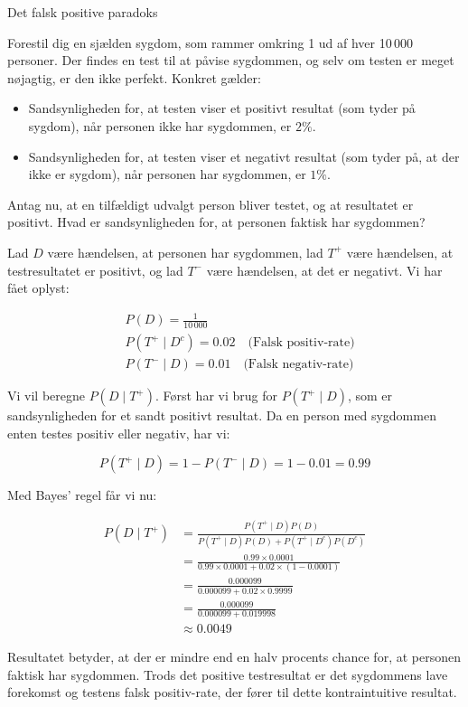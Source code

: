 \begin{example} Det falsk positive paradoks

   Forestil dig en sjælden sygdom, som rammer omkring 1 ud af hver 10\,000 personer. Der findes en test til at påvise sygdommen, og selv om testen er meget nøjagtig, er den ikke perfekt. Konkret gælder:
\begin{itemize}
    \item Sandsynligheden for, at testen viser et positivt resultat (som tyder på sygdom), når personen ikke har sygdommen, er $2 \%$.
    \item Sandsynligheden for, at testen viser et negativt resultat (som tyder på, at der ikke er sygdom), når personen har sygdommen, er $1 \%$.
\end{itemize}

Antag nu, at en tilfældigt udvalgt person bliver testet, og at resultatet er positivt. Hvad er sandsynligheden for, at personen faktisk har sygdommen?
\end{example}

\begin{solution}
    Lad \( D \) være hændelsen, at personen har sygdommen, lad \( T^+ \) være hændelsen, at testresultatet er positivt, og lad \( T^- \) være hændelsen, at det er negativt. Vi har fået oplyst:

\[
\begin{aligned}
& P(D) = \frac{1}{10\,000} \\
& P\left(T^+ \mid D^c\right) = 0.02 \quad \text{(Falsk positiv-rate)} \\
& P\left(T^- \mid D\right) = 0.01 \quad \text{(Falsk negativ-rate)}
\end{aligned}
\]

Vi vil beregne \( P(D \mid T^+) \). Først har vi brug for \( P(T^+ \mid D) \), som er sandsynligheden for et sandt positivt resultat. Da en person med sygdommen enten testes positiv eller negativ, har vi:

\[
P(T^+ \mid D) = 1 - P(T^- \mid D) = 1 - 0.01 = 0.99
\]

Med Bayes' regel får vi nu:

\[
\begin{aligned}
P(D \mid T^+) &= \frac{P(T^+ \mid D) P(D)}{P(T^+ \mid D) P(D) + P\left(T^+ \mid D^c\right) P\left(D^c\right)} \\
&= \frac{0.99 \times 0.0001}{0.99 \times 0.0001 + 0.02 \times (1 - 0.0001)} \\
&= \frac{0.000099}{0.000099 + 0.02 \times 0.9999} \\
&= \frac{0.000099}{0.000099 + 0.019998} \\
&\approx 0.0049
\end{aligned}
\]

Resultatet betyder, at der er mindre end en halv procents chance for, at personen faktisk har sygdommen. Trods det positive testresultat er det sygdommens lave forekomst og testens falsk positiv-rate, der fører til dette kontraintuitive resultat.
\end{solution}

